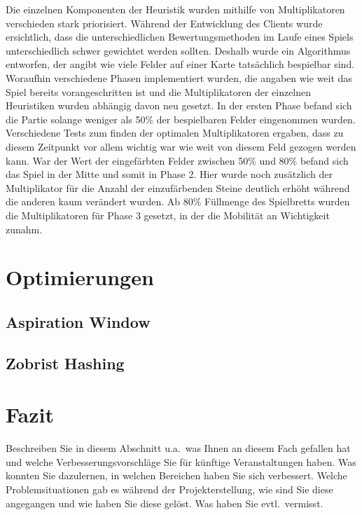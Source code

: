 \documentclass[12pt,a4paper,bibliography=totocnumbered,listof=totocnumbered]{article}
\begin{document}
Die einzelnen Komponenten der Heuristik wurden mithilfe von Multiplikatoren verschieden stark priorisiert. Während der Entwicklung des Clients wurde ersichtlich, dass die unterschiedlichen Bewertungsmethoden im Laufe eines Spiels unterschiedlich schwer gewichtet werden sollten. Deshalb wurde ein Algorithmus entworfen, der angibt wie viele Felder auf einer Karte tatsächlich bespielbar sind. Woraufhin verschiedene Phasen implementiert wurden, die angaben wie weit das Spiel bereits vorangeschritten ist und die Multiplikatoren der einzelnen Heuristiken wurden abhängig davon neu gesetzt. In der ersten Phase befand sich die Partie solange weniger als 50\% der bespielbaren Felder eingenommen wurden. Verschiedene Tests zum finden der optimalen Multiplikatoren ergaben, dass zu diesem Zeitpunkt vor allem wichtig war wie weit von diesem Feld gezogen werden kann. War der Wert der eingefärbten Felder zwischen 50\% und 80\% befand sich das Spiel in der Mitte und somit in Phase 2. Hier wurde noch zusätzlich der Multiplikator für die Anzahl der einzufärbenden Steine deutlich erhöht während die anderen kaum verändert wurden. Ab 80\% Füllmenge des Spielbretts wurden die Multiplikatoren für Phase 3 gesetzt, in der die Mobilität an Wichtigkeit zunahm.
 
\newpage
\section{Optimierungen}
\subsection{Aspiration Window}

\subsection{Zobrist Hashing}

\newpage
\section{Fazit}
Beschreiben Sie in diesem Abschnitt u.a.\ was Ihnen an diesem Fach gefallen hat und welche Verbesserungsvorschläge Sie für künftige Veranstaltungen haben. Was konnten Sie dazulernen, in welchen Bereichen haben Sie sich verbessert. Welche Problemsituationen gab es während der Projekterstellung, wie sind Sie diese angegangen und wie haben Sie diese gelöst. Was haben Sie evtl.\ vermisst.
\end{document}
